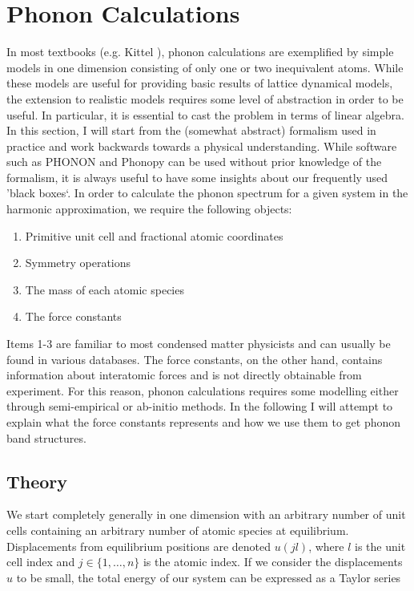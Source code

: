 \section{Phonon Calculations}
In most textbooks (e.g. Kittel \cite{Kittel2005}), phonon calculations are exemplified by simple models in one dimension consisting of only one or two inequivalent atoms. While these models are useful for providing basic results of lattice dynamical models, the extension to realistic models requires some level of abstraction in order to be useful. In particular, it is essential to cast the problem in terms of linear algebra. In this section, I will start from the (somewhat abstract) formalism used in practice and work backwards towards a physical understanding. While software such as PHONON \cite{Parlinski1997} and Phonopy \cite{Togo2015} can be used without prior knowledge of the formalism, it is always useful to have some insights about our frequently used 'black boxes`. In order to calculate the phonon spectrum for a given system in the harmonic approximation, we require the following objects:

\begin{enumerate}
	\item Primitive unit cell and fractional atomic coordinates
	\item Symmetry operations
	\item The mass of each atomic species
	\item The force constants
\end{enumerate}

Items 1-3 are familiar to most condensed matter physicists and can usually be found in various databases. The force constants, on the other hand, contains information about interatomic forces and is not directly obtainable from experiment. For this reason, phonon calculations requires some modelling either through semi-empirical or ab-initio methods. In the following I will attempt to explain what the force constants represents and how we use them to get phonon band structures.

\subsection{Theory}

We start completely generally in one dimension with an arbitrary number of unit cells containing an arbitrary number of atomic species at equilibrium. Displacements from equilibrium positions are denoted $u(jl)$, where $l$ is the unit cell index and $j \in \{1,\dots,n\}$ is the atomic index. If we consider the displacements $u$ to be small, the total energy of our system can be expressed as a Taylor series

